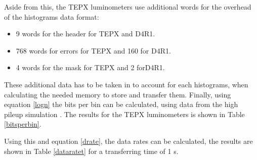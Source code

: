 Aside from this, the TEPX luminometers use additional words for the overhead of the histograms data format:
\begin{itemize}
    \item 9 words for the header for TEPX and D4R1.
    \item  768 words for errors for TEPX and 160 for D4R1.
    \item 4 words for the mask for TEPX and 2 forD4R1.
\end{itemize}
These additional data has to be taken in to account for each histograms, when calculating the needed memory to store and transfer them. Finally, using equation \ref{logn} the bits per bin can be calculated, using data from the high pileup simulation \cite{datarates}. The results for the TEPX luminometers is shown in Table \ref{bitsperbin}.
\begin{table}[ht]
\centering
\caption[ Memory bits required per histogram bin for the TEPX luminometers.]{Table shows the Trigger rate (kHz), counts per event per detector unit (histogram), number of counts per bx per integration period (1s) and the memory bits required per histogram bin.}
\label{bitsperbin}
\end{table}
Using this and equation \ref{drate}, the data rates can be calculated, the results are shown in Table \ref{dataratet} for a transferring time of 1 s.
\begin{table}[ht]
\centering
\caption[Data transfer rates for the TEPX luminometers.]{Data transfer rates for the TEPX luminometers for pileup 200. Columns shown are number of histograms, memory per histogram and data transfer rates (Mbps) for an integration period of 1s. }
\label{dataratet}
\end{table}
